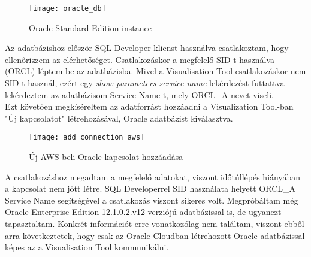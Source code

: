 \documentclass{article}
\begin{document}
\begin{figure}[h!]
	\centering
	\texttt{[image: oracle\_db]}
	\caption{Oracle Standard Edition instance}
	\label{fig:oracledb}
\end{figure}
Az adatbázishoz először SQL Developer klienst használva csatlakoztam, hogy ellenőrizzem az elérhetőséget. Csatlakozáskor a megfelelő SID-t használva (ORCL) léptem be az adatbázisba. Mivel a Visualisation Tool csatlakozáskor nem SID-t használ, ezért egy \textit{show parameters service name} lekérdezést futtattva lekérdeztem az adatbázisom Service Name-t, mely ORCL\_A nevet viseli. \\ Ezt követően megkíséreltem az adatforrást hozzáadni a Visualization Tool-ban "Új kapcsolatot" létrehozásával, Oracle adatbázist kiválasztva.
\begin{figure}[h!]
	\centering
	\texttt{[image: add\_connection\_aws]}
	\caption{Új AWS-beli Oracle kapcsolat hozzáadása}
	\label{fig:addconnectionaws}
\end{figure}
A csatlakozáshoz megadtam a megfelelő adatokat, viszont időtúllépés hiányában a kapcsolat nem jött létre. SQL Developerrel SID használata helyett ORCL\_A Service Name segítségével a csatlakozás viszont sikeres volt. Megpróbáltam még Oracle Enterprise Edition 12.1.0.2.v12 verziójú adatbázissal is, de ugyanezt tapasztaltam. Konkrét információt erre vonatkozólag nem találtam, viszont ebből arra következtetek, hogy csak az Oracle Cloudban létrehozott Oracle adatbázissal képes az a Visualisation Tool kommunikálni.
\end{document}
